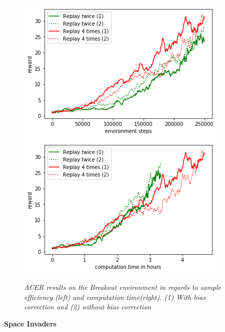 \begin{figure}[h]
\includegraphics[scale=0.55]{bilder/breakoutBConline.png}
\includegraphics[scale=0.55]{bilder/breakoutBCtime.png}
\caption{\textit{ACER results on the Breakout environment in regards to sample efficiency (left) and computation time(right). (1) With bias correction and (2) without bias correction}}
\end{figure}



\begin{center}
\textbf{Space Invaders}
\end{center}

